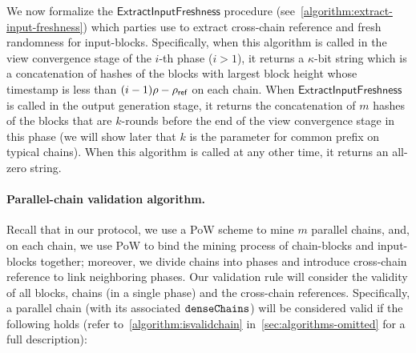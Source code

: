 We now formalize the $\mathsf{ExtractInputFreshness}$ procedure (see~\cref{algorithm:extract-input-freshness}) which parties use to extract cross-chain reference and fresh randomness for input-blocks.
%
Specifically, when this algorithm is called in the view convergence stage of the $i$-th phase ($i > 1$), it returns a $\kappa$-bit string which is a concatenation of hashes of the blocks with largest block height whose timestamp is less than $(i - 1) \rho - \rho_{\textsf{ref}}$ on each chain.
%
When $\mathsf{ExtractInputFreshness}$ is called in the output generation stage, it returns the concatenation of $m$ hashes of the blocks that are $k$-rounds before the end of the view convergence stage in this phase (we will show later that $k$ is the parameter for common prefix on typical chains).
%
When this algorithm is called at any other time, it returns an all-zero string.



\paragraph{Parallel-chain validation algorithm.}
%
Recall that in our protocol, we use a \mforone PoW scheme to mine $m$ parallel chains, and, on each chain, we use \twoforone PoW to bind the mining process of chain-blocks \block and input-blocks \IB together; moreover, we divide chains into phases and introduce cross-chain reference to link neighboring phases.
%
Our validation rule will consider the validity of all blocks, chains (in a single phase) and the cross-chain references.
%
Specifically, a parallel chain \parallelChains (with its associated $\mathtt{denseChains}$) will be considered valid if the following holds (refer to~\cref{algorithm:isvalidchain} in~\cref{sec:algorithms-omitted} for a full description):

